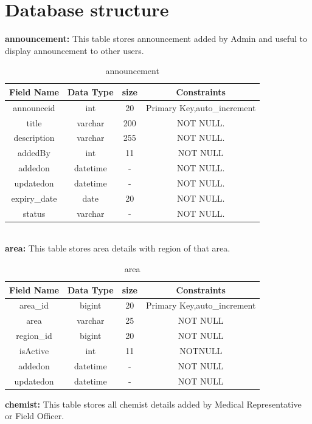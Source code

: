 \section{Database structure}
\textbf{announcement:}  This table stores announcement added by Admin and useful to display announcement to other users.\nolinebreak
\begin{table}[hp]
\centering

\begin{tabular}{|c|c|c|c|}
\hline
\textbf{Field Name}  & \textbf{Data Type}  & \textbf{size} &\textbf{Constraints}  \\
\hline
announceid & int & 20 & Primary Key,auto\_increment \\
\hline
title &	varchar &	200 & NOT NULL.\\
\hline
description & varchar &	255 & NOT NULL.\\
\hline
addedBy	& int & 11 &	NOT NULL\\
\hline
addedon &	datetime &	- &	NOT NULL.\\
\hline
updatedon &	datetime &	- &	NOT NULL.\\
\hline
expiry\_date & date & 20 & NOT NULL.\\
\hline
status	& varchar &	- & NOT NULL. \\
\hline

\end{tabular}
\caption{ announcement}
\end{table}
\\
\textbf{area:} This table stores area details with region of that area.\nolinebreak
\begin{table}[hp]
\centering
\begin{tabular}{|c|c|c|c|}
\hline
\textbf{Field Name}  & \textbf{Data Type}  & \textbf{size} &\textbf{Constraints}  \\
\hline
area\_id & bigint &	20 & Primary Key,auto\_increment\\
\hline
area &	varchar &	25 & NOT NULL \\
\hline
region\_id &	bigint & 20 & NOT NULL \\
\hline
isActive &	int & 	11  & NOTNULL \\
\hline
addedon & datetime & - & NOT NULL\\
\hline
updatedon &	datetime & - & NOT NULL\\
\hline
\end{tabular}
\caption{area}
\end{table}

\pagebreak
\textbf{chemist:}  This table stores all chemist details added by Medical Representative or Field Officer.\nolinebreak

